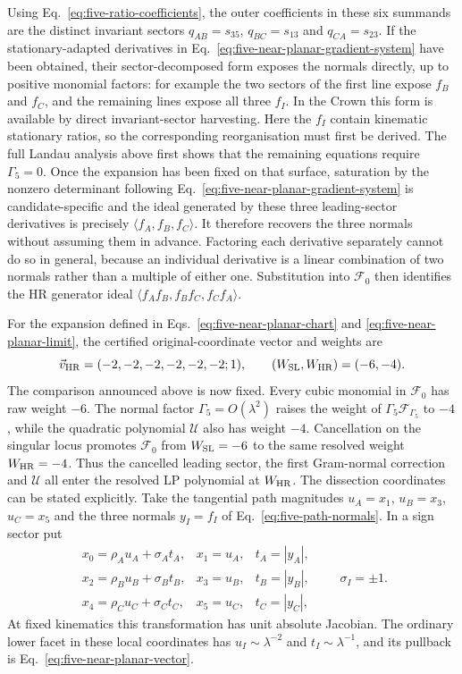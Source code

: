 \documentclass[a4paper,11pt]{article}
\newcommand{\WSL}{W_{\rm SL}}
\newcommand{\WHR}{W_{\rm HR}}
\newcommand{\vHR}{\vec v_{\rm HR}}
\begin{document}
Using Eq.~\eqref{eq:five-ratio-coefficients}, the outer coefficients in these
six summands are the distinct invariant sectors
\(q_{AB}=s_{35}\), \(q_{BC}=s_{13}\) and \(q_{CA}=s_{23}\).  If the
stationary-adapted derivatives in
Eq.~\eqref{eq:five-near-planar-gradient-system} have been obtained, their
sector-decomposed form exposes the normals directly, up to positive monomial
factors:
for example the two sectors of the first line expose \(f_B\) and \(f_C\),
and the remaining lines expose all three \(f_I\).  In the Crown this form is
available by direct invariant-sector harvesting.  Here the \(f_I\) contain
kinematic stationary ratios, so the corresponding reorganisation must first
be derived.  The full Landau analysis above first shows that the remaining
equations require \(\Gamma_5=0\).  Once the expansion has been fixed on that
surface, saturation by the nonzero determinant following
Eq.~\eqref{eq:five-near-planar-gradient-system} is candidate-specific and
the ideal generated by these three leading-sector derivatives is precisely
\(\langle f_A,f_B,f_C\rangle\).  It therefore recovers the three normals
without assuming them in advance.  Factoring each derivative separately
cannot do so in general, because an individual derivative is a linear
combination of two normals rather than a multiple of either one.  Substitution
into \(\mathcal F_0\) then identifies the HR generator ideal
\(\langle f_Af_B,f_Bf_C,f_Cf_A\rangle\).

For the expansion defined in Eqs.~\eqref{eq:five-near-planar-chart} and
\eqref{eq:five-near-planar-limit}, the certified original-coordinate vector
and weights are
\begin{equation}
 \vHR=(-2,-2,-2,-2,-2,-2;1),
 \qquad (\WSL,\WHR)=(-6,-4).
 \label{eq:five-near-planar-vector}
\end{equation}
The comparison announced above is now fixed.  Every cubic monomial in
\(\mathcal F_0\) has raw weight \(-6\).  The normal factor
\(\Gamma_5=O(\lambda^2)\) raises the weight of
\(\Gamma_5\mathcal F_{\Gamma_5}\) to \(-4\), while the quadratic polynomial
\(\mathcal U\) also has weight \(-4\).  Cancellation on the singular locus
promotes \(\mathcal F_0\) from \(\WSL=-6\) to the same resolved weight
\(\WHR=-4\).  Thus the cancelled leading sector, the first Gram-normal
correction and \(\mathcal U\) all enter the resolved LP polynomial at
\(\WHR\).
The dissection coordinates can be stated explicitly.  Take the tangential
path magnitudes \(u_A=x_1\), \(u_B=x_3\), \(u_C=x_5\) and the three normals
\(y_I=f_I\) of Eq.~\eqref{eq:five-path-normals}.  In a sign sector put
\[
 \begin{array}{lll}
 x_0=\rho_Au_A+\sigma_A t_A,&x_1=u_A,&t_A=|y_A|,\\
 x_2=\rho_Bu_B+\sigma_B t_B,&x_3=u_B,&t_B=|y_B|,\\
 x_4=\rho_Cu_C+\sigma_C t_C,&x_5=u_C,&t_C=|y_C|,
 \end{array}
 \qquad \sigma_I=\pm1 .
\]
At fixed kinematics this transformation has unit absolute Jacobian.  The
ordinary lower facet in these local coordinates has
\(u_I\sim\lambda^{-2}\) and \(t_I\sim\lambda^{-1}\), and its pullback is
Eq.~\eqref{eq:five-near-planar-vector}.
\end{document}
